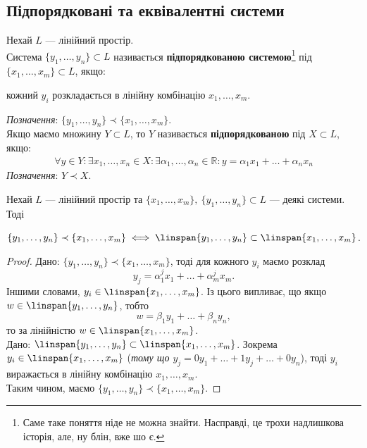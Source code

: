 \documentclass{math_library}
\begin{document}
	\subsection{Підпорядковані та еквівалентні системи}	
	\begin{definition}
	Нехай $L$ --- лінійний простір.\\
	Система $\{y_1, \dots, y_n \} \subset L$ називається \textbf{підпорядкованою системою}\footnote{Саме таке поняття ніде не можна знайти. Насправді, це трохи надлишкова історія, але, ну блін, вже шо є.} під $\{x_1, \dots, x_m\} \subset L$, якщо:
	\begin{center}
	кожний $y_i$ розкладається в лінійну комбінацію $x_1,\dots,x_m$.
	\end{center}
	\textit{Позначення}: $\{y_1, \dots, y_n \} \prec \{x_1, \dots, x_m \}$.\\
	Якщо маємо множину $Y \subset L$, то $Y$ називається \textbf{підпорядкованою} під $X \subset L$, якщо:
	\begin{align*}
	\forall y \in Y: \exists x_1,\dots,x_n \in X: \exists \alpha_1, \dots, \alpha_n \in \mathbb{R}: y = \alpha_1 x_1 + \dots + \alpha_n x_n
	\end{align*}
	\textit{Позначення}: $Y \prec X$.
	\end{definition}
	
	\begin{proposition}
	\label{subordinate_prp1}
	Нехай $L$ --- лінійний простір та $\{x_1,\dots,x_m\},\ \{y_1,\dots,y_n\} \subset L$ --- деякі системи. Тоді
	\begin{center}
	$\{y_1, \dots, y_n \} \prec \{x_1, \dots, x_m \} \iff \linspan \{y_1, \dots, y_n\} \subset \linspan \{x_1, \dots, x_m \}$.
	\end{center}
	\end{proposition}
	
	\begin{proof}
	\rightproof Дано: $\{y_1, \dots, y_n \} \prec \{x_1, \dots, x_m \}$, тоді для кожного $y_i$ маємо розклад
	\[
	y_j = \alpha^j_1 x_1 + \dots + \alpha^j_m x_m.
	\]
	Іншими словами, $y_i \in \linspan\{x_1,\dots,x_m\}$. Із цього випливає, що якщо $w \in \linspan\{y_1, \dots, y_n\}$, тобто
	\[
	w = \beta_1 y_1 + \dots + \beta_n y_n,
	\]
	то за лінійністю $w \in \linspan\{x_1, \dots, x_m\}$.
	\bigskip \\
	\leftproof Дано: $\linspan \{y_1, \dots, y_n\} \subset \linspan \{x_1, \dots, x_m \}$. Зокрема $y_i \in \linspan\{x_1,\dots,x_m\}$ (\textit{тому що $y_j = 0y_1 + \dots + 1 y_j + \dots + 0 y_n$}), тоді $y_i$ виражається в лінійну комбінацію $x_1,\dots,x_m$.\\
	Таким чином, маємо $\{y_1, \dots, y_n \} \prec \{x_1, \dots, x_m \}$.
	\end{proof}
	
\end{document}
